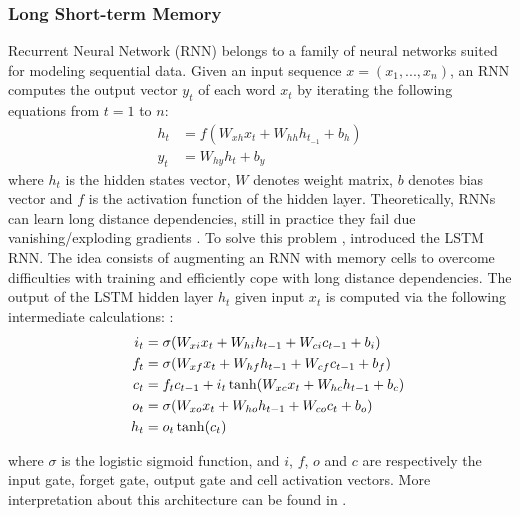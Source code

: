 \documentclass[11pt,letterpaper]{article}
\begin{document}
\subsubsection{Long Short-term Memory}
Recurrent Neural Network (RNN) belongs to a family of neural networks suited for modeling sequential data. Given an input sequence $x = (x_1, ..., x_n)$, an RNN computes the output vector $y_t$ of each word $x_t$ by iterating the following equations from $t = 1$ to $n$:
\begin{align*}
h_t &= f(W_{xh} x_t + W_{hh} h_{t_{-1}} + b_h )\\
y_t &= W_{hy} h_t + b_y
\end{align*}
where $h_t$ is the hidden states vector, $W$ denotes weight matrix, $b$ denotes bias vector and $f$ is the activation function of the hidden layer. Theoretically, RNNs can learn long distance dependencies, still in practice they fail due vanishing/exploding gradients \cite{bengio:1994}.
To solve this problem ,  introduced the LSTM RNN. The idea consists of augmenting an RNN with memory cells to overcome difficulties with training and efficiently cope with long distance dependencies.
The output of the LSTM hidden layer $h_t$ given input $x_t$ is computed via the following intermediate calculations: \cite{graves:2013}:
\vspace*{-1mm}
\begin{align*}
\hspace*{5mm}
i_t &= \sigma(W_{xi} x_t + W_{hi} h_{t-1} + W_{ci} c_{t-1} + b_i )
\\ f_t &= \sigma(W_{xf} x_t + W_{hf} h_{t-1} + W_{cf} c_{t-1} + b_f )
\\c_t &= f_t c_{t-1} + i_t \tanh(W_{xc} x_t + W_{hc} h_{t-1} + b_c)
\\ o_t &= \sigma(W_{xo} x_t + W_{ho} h_{t-1} + W_{co} c_t + b_o )
\\ h_t &= o_t \tanh(c_t)
\end{align*}

where $\sigma$ is the logistic sigmoid function, and $i$, $f$, $o$ and $c$ are respectively the input gate, forget gate, output gate and cell activation vectors. More interpretation about this architecture can be found in \cite{Lipton:15}. 
\end{document}
